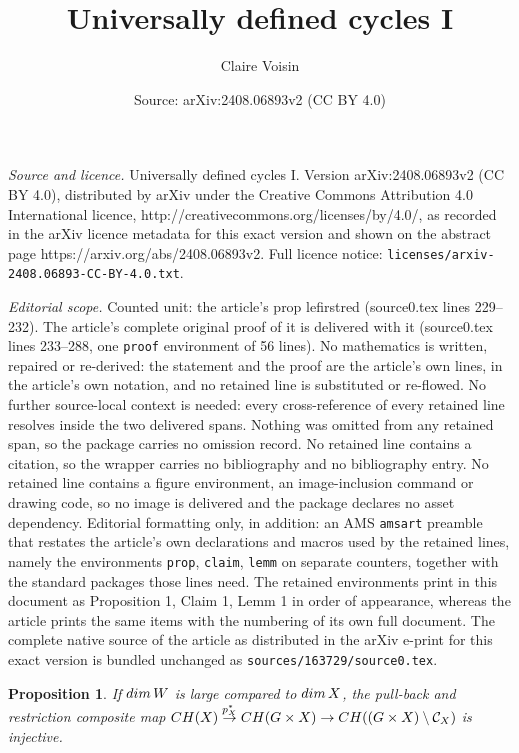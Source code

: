 \documentclass[10pt,a4paper]{amsart}
\title{Universally defined cycles I}
\author{Claire Voisin}
\date{Source: arXiv:2408.06893v2 (CC BY 4.0)}
\newtheorem{prop}{Proposition}
\begin{document}
\maketitle

\noindent\emph{Source and licence.} Universally defined cycles I. Version arXiv:2408.06893v2 (CC BY 4.0), distributed by arXiv under the Creative Commons Attribution 4.0 International licence, http://creativecommons.org/licenses/by/4.0/, as recorded in the arXiv licence metadata for this exact version and shown on the abstract page https://arxiv.org/abs/2408.06893v2. Full licence notice: \texttt{licenses/arxiv-2408.06893-CC-BY-4.0.txt}.\par\smallskip

\noindent\textit{Editorial scope.} Counted unit: the article's prop lefirstred (source0.tex lines 229--232). The article's complete original proof of it is delivered with it (source0.tex lines 233--288, one \texttt{proof} environment of 56 lines). No mathematics is written, repaired or re-derived: the statement and the proof are the article's own lines, in the article's own notation, and no retained line is substituted or re-flowed.  No further source-local context is needed: every cross-reference of every retained line resolves inside the two delivered spans.  Nothing was omitted from any retained span, so the package carries no omission record.  No retained line contains a citation, so the wrapper carries no bibliography and no bibliography entry.  No retained line contains a figure environment, an image-inclusion command or drawing code, so no image is delivered and the package declares no asset dependency.  Editorial formatting only, in addition: an AMS \texttt{amsart} preamble that restates the article's own declarations and macros used by the retained lines, namely the environments \texttt{prop}, \texttt{claim}, \texttt{lemm} on separate counters, together with the standard packages those lines need.  The retained environments print in this document as Proposition 1, Claim 1, Lemm 1 in order of appearance, whereas the article prints the same items with the numbering of its own full document.  The complete native source of the article as distributed in the arXiv e-print for this exact version is bundled unchanged as \texttt{sources/163729/source0.tex}.
 \begin{prop}\label{lefirstred} If ${\rm dim}\,W$ is large compared to ${\rm dim}\,X$,
 the pull-back and restriction composite map
 ${\rm CH}(X)\stackrel{p_X^*}{\rightarrow }{\rm CH}(G\times X)\rightarrow {\rm CH}((G\times X)\setminus \mathcal{C}_X)$ is injective.
\end{prop}
\end{document}
